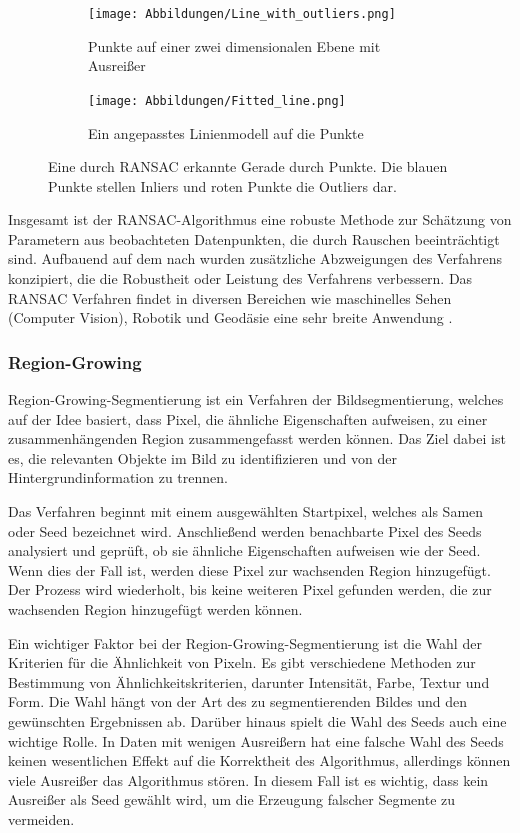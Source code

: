 \begin{figure}[!b]
	\centering
	\begin{subfigure}{0.43\textwidth}
		\texttt{[image: Abbildungen/Line\_with\_outliers.png]}
		\centering
		\caption{Punkte auf einer zwei dimensionalen Ebene mit Ausreißer}
		\label{fig: line_with_outliers}
	\end{subfigure}
	\hfill
	\begin{subfigure}{0.43\textwidth}
		\texttt{[image: Abbildungen/Fitted\_line.png]}
		\centering
		\caption{Ein angepasstes Linienmodell auf die Punkte}
		\label{fig: fitted_line}
	\end{subfigure}
	\caption{Eine durch RANSAC erkannte Gerade durch Punkte. Die blauen Punkte stellen Inliers und roten Punkte die Outliers dar.}
	\label{fig: ransac_line}
\end{figure}

Insgesamt ist der RANSAC-Algorithmus eine robuste Methode zur Schätzung von Parametern aus beobachteten Datenpunkten, die durch Rauschen beeinträchtigt sind. Aufbauend auf dem nach \textcite{fischler_random_1981} wurden zusätzliche Abzweigungen des Verfahrens konzipiert, die die Robustheit oder Leistung des Verfahrens verbessern. Das RANSAC Verfahren findet in diversen Bereichen wie maschinelles Sehen (Computer Vision), Robotik und Geodäsie eine sehr breite Anwendung \autocite[2]{martinez-otzeta_ransac_2023}.

\subsubsection{Region-Growing}
Region-Growing-Segmentierung ist ein Verfahren der Bildsegmentierung, welches auf der Idee basiert, dass Pixel, die ähnliche Eigenschaften aufweisen, zu einer zusammenhängenden Region zusammengefasst werden können. Das Ziel dabei ist es, die relevanten Objekte im Bild zu identifizieren und von der Hintergrundinformation zu trennen. \autocite[641]{adams_seeded_1994}

Das Verfahren beginnt mit einem ausgewählten Startpixel, welches als Samen oder Seed bezeichnet wird. Anschließend werden benachbarte Pixel des Seeds analysiert und geprüft, ob sie ähnliche Eigenschaften aufweisen wie der Seed. Wenn dies der Fall ist, werden diese Pixel zur wachsenden Region hinzugefügt. Der Prozess wird wiederholt, bis keine weiteren Pixel gefunden werden, die zur wachsenden Region hinzugefügt werden können.\autocite[641-642]{adams_seeded_1994}

Ein wichtiger Faktor bei der Region-Growing-Segmentierung ist die Wahl der Kriterien für die Ähnlichkeit von Pixeln. Es gibt verschiedene Methoden zur Bestimmung von Ähnlichkeitskriterien, darunter Intensität, Farbe, Textur und Form. Die Wahl hängt von der Art des zu segmentierenden Bildes und den gewünschten Ergebnissen ab. Darüber hinaus spielt die Wahl des Seeds auch eine wichtige Rolle. In Daten mit wenigen Ausreißern hat eine falsche Wahl des Seeds keinen wesentlichen Effekt auf die Korrektheit des Algorithmus, allerdings können viele Ausreißer das Algorithmus stören. In diesem Fall ist es wichtig, dass kein Ausreißer als Seed gewählt wird, um die Erzeugung falscher Segmente zu vermeiden. \autocite[641-643]{adams_seeded_1994}

